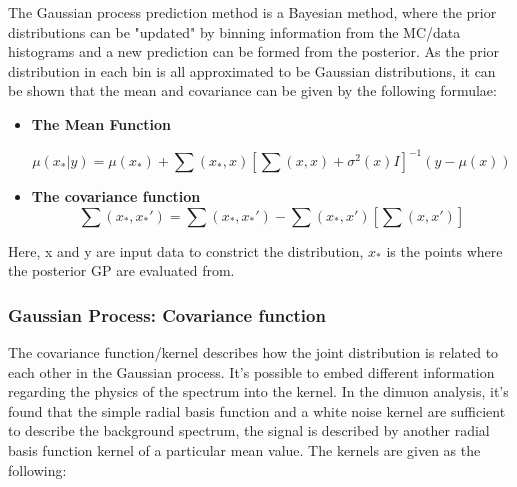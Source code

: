     The Gaussian process prediction method is a Bayesian method, where the prior distributions can be "updated" by binning information from the MC/data histograms and a new prediction can be formed from the posterior. As the prior distribution in each bin is all approximated to be Gaussian distributions, it can be shown that the mean and covariance can be given by the following formulae:

    \begin{itemize}

        \item \textbf{The Mean Function}

    \begin{equation}
        \mu(x_{*}|y)  = \mu(x_{*})+ \sum(x_{*}, x)[\sum(x, x)+ \sigma^{2}(x)I]^{-1}(y-\mu(x))
    \end{equation}

        \item \textbf{The covariance function}
    \begin{equation}
        \sum(x_{*}, x_{*}') = \sum(x_{*}, x_{*}') - \sum(x_{*}, x')[\sum(x, x')]
    \end{equation}

\end{itemize}

    Here, x and y are input data to constrict the distribution, $x_{*}$ is the points where the posterior GP are evaluated from. 

\subsubsection{Gaussian Process: Covariance function}
The covariance function/kernel describes how the joint distribution is related to each other in the Gaussian process. 
It's possible to embed different information regarding the physics of the spectrum into the kernel. 
In the dimuon analysis, it's found that the simple radial basis function and a white noise kernel are sufficient to describe the background spectrum, the signal is described by another radial basis function kernel of a particular mean value.
The kernels are given as the following:


